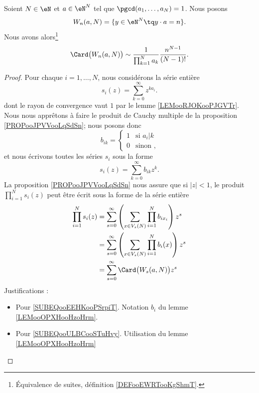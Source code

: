 \begin{theorem} \label{THOooQDYWooCOiUMb}
    Soient \( N\in \eN\) et \( a\in \eN^N\) tel que \( \pgcd(a_1,\ldots, a_{N})=1\). Nous posons
    \begin{equation}
        W_n(a,N)=\{ y\in \eN^N\tq y\cdot a=n \}.
    \end{equation}
    Nous avons alors\footnote{Équivalence de suites, définition \ref{DEFooEWRTooKgShmT}.}
    \begin{equation}
        \Card\big( W_n(a,N) \big)\sim\frac{1}{ \prod_{k=1}^Na_k }\frac{ n^{N-1} }{ (N-1)! }.
    \end{equation}
\end{theorem}

\begin{proof}
    Pour chaque \( i=1,\ldots, N\), nous considérons la série entière
    \begin{equation}
        s_i(z)=\sum_{k=0}^{\infty}z^{ka_i}.
    \end{equation}
    dont le rayon de convergence vaut \( 1\) par le lemme \ref{LEMooRJOKooPJGVTr}. Nous nous apprêtons à faire le produit de Cauchy multiple de la proposition \ref{PROPooJPVVooLqSdSn}; nous posons donc
    \begin{equation}
        b_{ik}=\begin{cases}
            1    &   \text{si } a_i|k\\
            0    &    \text{sinon },
        \end{cases}
    \end{equation}
    et nous écrivons toutes les séries \( s_i\) sous la forme
    \begin{equation}
        s_i(z)=\sum_{k=0}^{\infty}b_{ik}z^k.
    \end{equation}
    La proposition \ref{PROPooJPVVooLqSdSn} nous assure que si \( | z |<1\), le produit \( \prod_{i=1}^Ns_i(z)\) peut être écrit sous la forme de la série entière
    \begin{subequations}        \label{SUBEQooYESHooChEKGm}
        \begin{align}
            \prod_{i=1}^Ns_i(z)&=\sum_{s=0}^{\infty}\left( \sum_{x\in V_s(N)}\prod_{i=1}^Nb_{ix_i} \right)z^s\\
            &=\sum_{s=0}^{\infty}\left( \sum_{x\in V_s(N)}\prod_{i=1}^Nb_i(x) \right)z^s        \label{SUBEQooEEHKooPSrpiT} \\
            &=\sum_{s=0}^{\infty}\Card\big( W_s(a,N) \big)z^s       \label{SUBEQooULBCooSTuHvy}
        \end{align}
    \end{subequations}
    Justifications :
    \begin{itemize}
        \item Pour \eqref{SUBEQooEEHKooPSrpiT}. Notation \( b_i\) du lemme \ref{LEMooOPXHooHzoHrm}.
        \item Pour \eqref{SUBEQooULBCooSTuHvy}. Utilisation du lemme \ref{LEMooOPXHooHzoHrm}
    \end{itemize}
    

\end{proof}
